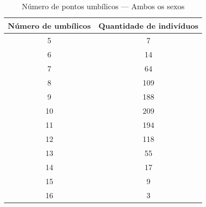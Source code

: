 \documentclass[a4paper,12pt]{article}
\begin{document}
\begin{table}[h!]
\centering
\caption{Número de pontos umbílicos — Ambos os sexos}
\begin{tabular}{c c}
\hline
\textbf{Número de umbílicos} & \textbf{Quantidade de indivíduos} \\ 
\hline
5  & 7   \\
6  & 14  \\
7  & 64  \\
8  & 109 \\
9  & 188 \\
10 & 209 \\
11 & 194 \\
12 & 118 \\
13 & 55  \\
14 & 17  \\
15 & 9   \\
16 & 3   \\
\hline
\end{tabular}
\end{table}
\end{document}
